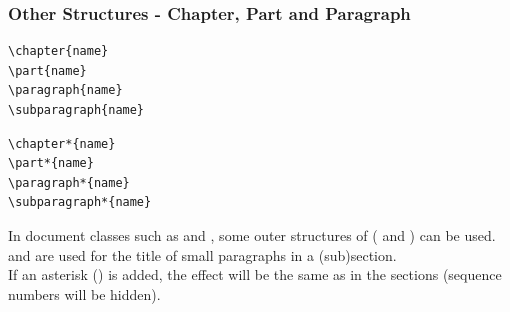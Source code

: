 \begin{frame}[fragile]
	\frametitle{Other Structures - Chapter, Part and Paragraph}
	\begin{command}
		\begin{multicols}{2}
			\begin{verbatim}
\chapter{name}
\part{name}
\paragraph{name}
\subparagraph{name}
			\end{verbatim}
			\begin{verbatim}
\chapter*{name}
\part*{name}
\paragraph*{name}
\subparagraph*{name}
			\end{verbatim}
		\end{multicols}
		\vspace{-0.5em}
	\end{command}
	In document classes such as  and , some outer structures of  (\LC{\chapter} and \LC{\part}) can be used. \\[0.5em]
	\LC{\paragraph} and \LC{\subparagraph} are used for the title of small paragraphs in a (sub)section.\\[0.5em]
	If an asterisk (\structure{*}) is added, the effect will be the same as in the sections (sequence numbers will be hidden).
\end{frame}

